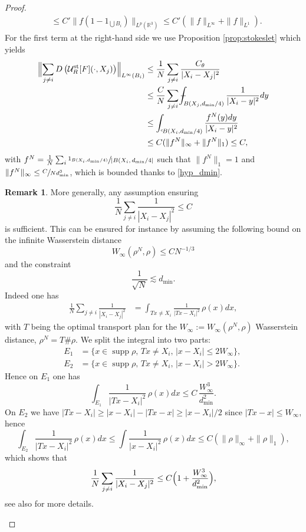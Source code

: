 \documentclass[10pt]{amsart}
\newcommand{\st}{\mathrm{st}}
\def\Xint#1{\mathchoice
{\XXint\displaystyle\textstyle{#1}}%
{\XXint\textstyle\scriptstyle{#1}}%
{\XXint\scriptstyle\scriptscriptstyle{#1}}%
{\XXint\scriptscriptstyle\scriptscriptstyle{#1}}%
\!\int}
\def\XXint#1#2#3{{\setbox0=\hbox{$#1{#2#3}{\int}$ }
\vcenter{\hbox{$#2#3$ }}\kern-.6\wd0}}
\def\dashint{\Xint-}
\theoremstyle{plain}
\theoremstyle{definition}
\newtheorem{rem}{Remark}[section]
\newcommand{\supp}{\operatorname{supp}}
\newcommand{\R}{\mathbb{R}}
\let\oldbigcup\bigcup
\begin{document}
\begin{proof}
\begin{align*}
&\le C' \|f (1-1_{\oldbigcup B_i})\|_{L^p(\R^3)} \le C' (\|f\|_{L^\infty} + \|f\|_{L^1}).
\end{align*}
For the first term at the right-hand side we use Proposition \ref{prop:stokeslet} which yields
\begin{align*}
\Bigl\| \sum_{j \neq i} D\left(\mathcal{U}^{\st}_R[F] (\cdot,X_j)\right) \Bigr\|_{L^\infty(B_i)}& \leq \frac{1}{N} \sum_{j \neq i} \frac{C_\theta }{|X_i-X_j|^2} \\
& \leq \frac{C}{N}\sum_{j \neq i}\dashint_{B(X_j,d_{\min}/4)} \frac{1}{|X_i-y|^2}dy \\
&\leq \int_{{}^\mathrm{c}\! B(X_i,d_{\min}/4)} \frac{f^N(y)dy}{|X_i-y|^2}\\
&\leq C(\|f^N\|_\infty+\|f^N\|_1)\leq C,
\end{align*}
with $f^N=\frac{1}{N} \sum_i \sfrac{1_{B(X_i,d_{\min}/4)}}{|B(X_i,d_{\min}/4|}$ such that $\|f^N\|_1=1$ and $\|f^N\|_\infty \leq \sfrac{C}{N d_{\min}^3}$, which is bounded thanks to \eqref{hyp_dmin}.
\begin{rem}\label{discussion_d_min}
More generally, any assumption ensuring
\[
\frac{1}{N} \sum_{j \neq i} \frac{1 }{|X_i-X_j|^2} \leq C
\]
is sufficient. This can be ensured for instance by assuming the following bound on the infinite Wasserstein distance
\[
W_\infty(\rho^N,\rho) \leq CN^{-1/3}
\]
and the constraint
\[
\frac{1}{\sqrt{N}} \lesssim d_{\min}.
\]
Indeed one has
\begin{align*}
\frac{1}{N}\sum_{j \neq i} \frac{1}{|X_i-X_j|^2}&= \int_{Tx\neq X_i}\frac{1}{|Tx-X_i|^2} \,\rho(x) dx,
\end{align*}
with $T$ being the optimal transport plan for the $W_\infty:=W_\infty(\rho^N,\rho)$ Wasserstein distance, $\rho^N=T\# \rho$. We split the integral into two parts:
\begin{align*}
E_1&=\{ x \in \supp \rho,\, Tx \neq X_i,\, |x-X_i| \leq 2W_\infty\},\,
\\
E_2 &= \{ x \in \supp \rho,\, Tx \neq X_i,\, |x-X_i|>2W_\infty\}.
\end{align*}
Hence on $E_1$ one has
\[
\int_{E_1}\frac{1}{|Tx-X_i|^2}\, \rho(x) dx \leq C\,\frac{W_\infty^3}{d_{\min}^2}.
\]
On $E_2$ we have $|Tx-X_i|\geq |x-X_i|-|Tx-x|\geq |x-X_i|/2 $ since $ |Tx-x| \leq W_\infty$, hence
\[
\int_{E_2}\frac{1}{|Tx-X_i|^2}\, \rho(x) dx \leq \int \frac{1}{|x-X_i|^2}\, \rho(x) dx \leq C(\|\rho\|_\infty+\|\rho\|_1),
\]
which shows that
\[
\frac{1}{N}\sum_{j \neq i} \frac{1}{|X_i-X_j|^2} \leq C\Bigl(1+\frac{W_\infty^3}{d_{\min}^2}\Bigr),
\]
see also \cite[Lem.\,2.3]{HoferSchubert23} for more details.\qedhere
\end{rem}
\end{proof}
\end{document}
